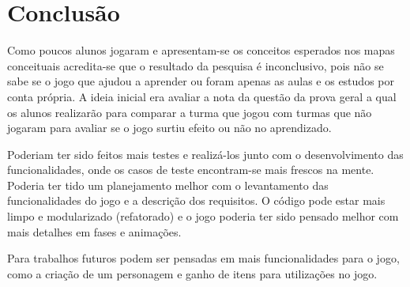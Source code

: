 \chapter[Conclusão]{Conclusão}

Como poucos alunos jogaram e apresentam-se os conceitos esperados nos mapas conceituais acredita-se que o resultado da pesquisa é inconclusivo, pois não se sabe se o jogo que ajudou a aprender ou foram apenas as aulas e os estudos por conta própria. A ideia inicial era avaliar a nota da questão da prova geral a qual os alunos realizarão para comparar a turma que jogou com turmas que não jogaram para avaliar se o jogo surtiu efeito ou não no aprendizado.


Poderiam ter sido feitos mais testes e realizá-los junto com o desenvolvimento das funcionalidades, onde os casos de teste encontram-se mais frescos na mente. Poderia ter tido um planejamento melhor com o levantamento das funcionalidades do jogo e a descrição dos requisitos. O código pode estar mais limpo e modularizado (refatorado) e o jogo poderia ter sido pensado melhor com mais detalhes em fases e animações.

Para trabalhos futuros podem ser pensadas em mais funcionalidades para o jogo, como a criação de um personagem e ganho de itens para utilizações no jogo.